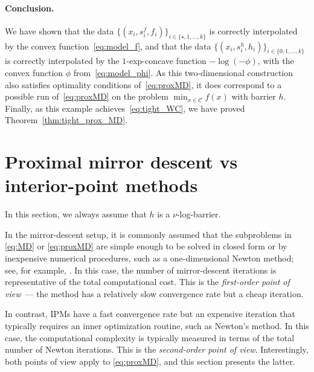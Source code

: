 \documentclass[a4paper]{article}
\newcommand{\CC}{\mathcal{C}}
\begin{document}
\paragraph{Conclusion.}
We have shown that the data $\{(x_i,s_i^f,f_i)\}_{i\in\{\star,1,\ldots,k\}}$ is correctly interpolated by the convex function~\eqref{eq:model_f}, and that the data $\{(x_i,s_i^h,h_i)\}_{i\in\{0,1,\ldots,k\}}$ is correctly interpolated by the $1$-exp-concave function $-\log(-\phi)$, with the convex function $\phi$ from~\eqref{eq:model_phi}.
As this two-dimensional construction also satisfies optimality conditions of~\eqref{eq:proxMD}, it does correspond to a possible run of~\eqref{eq:proxMD} on the problem $\min_{x\in \CC}f(x)$ with barrier $h$.
Finally, as this example achieves~\eqref{eq:tight_WC}, we have proved Theorem~\ref{thm:tight_prox_MD}.

\section{Proximal mirror descent vs interior-point methods}\label{sec:ip}

In this section, we always assume that $h$ is a $\nu$-log-barrier.

In the mirror-descent setup, it is commonly assumed that the subproblems in \eqref{eq:MD} or \eqref{eq:proxMD} are simple enough to be solved in closed form or by inexpensive numerical procedures, such as a one-dimensional Newton method; see, for example, \cite{bauschke2017,lu2017}. In this case, the number of mirror-descent iterations is representative of the total computational cost. This is the \emph{first-order point of view}~--- the method has a relatively slow convergence rate but a cheap iteration.

In contrast, IPMs have a fast convergence rate but an expensive iteration that typically requires an inner optimization routine, such as Newton's method. In this case, the computational complexity is typically measured in terms of the total number of Newton iterations. This is the \emph{second-order point of view}. Interestingly, both points of view apply to \eqref{eq:proxMD}, and this section presents the latter.
\end{document}
